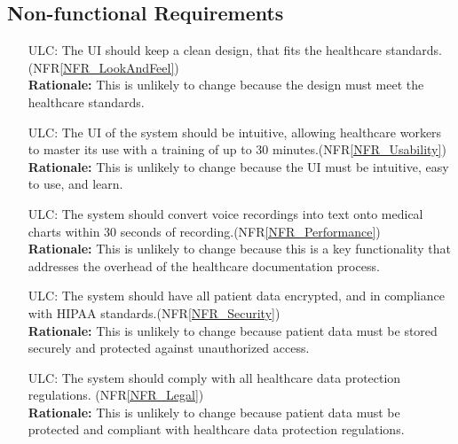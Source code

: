 \documentclass[12pt]{article}
\newcounter{lcnum} %
\newcounter{ulcnum} %
\begin{document}
\subsection{Non-functional Requirements}
\noindent \begin{itemize}
  \item[ULC\refstepcounter{ulcnum}\theulcnum\label{ULC_LookAndFeel}:] The UI should keep a clean design, that fits the healthcare standards.(NFR\ref{NFR_LookAndFeel})\\
  \textbf{Rationale:} This is unlikely to change because the design must meet the healthcare standards.

  \item[ULC\refstepcounter{ulcnum}\theulcnum\label{ULC_usability}:] The UI of the system should be intuitive, allowing healthcare workers to master its use with a training of up to 30 minutes.(NFR\ref{NFR_Usability})\\
  \textbf{Rationale:} This is unlikely to change because the UI must be intuitive, easy to use, and learn.

  \item[ULC\refstepcounter{ulcnum}\theulcnum\label{ULC_performance}:] The system should convert voice recordings into text onto medical charts within 30 seconds of recording.(NFR\ref{NFR_Performance})\\
  \textbf{Rationale:} This is unlikely to change because this is a key functionality that addresses the overhead of the healthcare documentation process.

  \item[ULC\refstepcounter{ulcnum}\theulcnum\label{ULC_security}:] The system should have all patient data encrypted, and in compliance with HIPAA standards.(NFR\ref{NFR_Security})\\
  \textbf{Rationale:} This is unlikely to change because patient data must be stored securely and protected against unauthorized access.

  \item[ULC\refstepcounter{ulcnum}\theulcnum\label{ULC_legal}:] The system should comply with all healthcare data protection regulations. (NFR\ref{NFR_Legal})\\
  \textbf{Rationale:} This is unlikely to change because patient data must be protected and compliant with healthcare data protection regulations.
\end{itemize}
\end{document}
